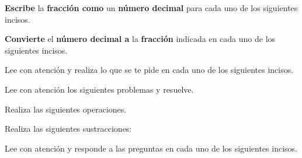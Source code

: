 \documentclass[11pt,addpoints]{exam}
\begin{document}

\begin{questions}
  \question[10] \textbf{Escribe} la \textbf{fracción como} un \textbf{n\'umero decimal} para cada uno de los siguientes incisos.
  \begin{multicols}{2}
    \begin{parts}
      
      
    \end{parts}
  \end{multicols}
  \newpage
  \question[10] \textbf{Convierte} el \textbf{n\'umero decimal a} la \textbf{fracción} indicada en cada uno de los siguientes incisos.

  \begin{multicols}{2}
    \begin{parts}
      
      
    \end{parts}
  \end{multicols}

  \question[10] Lee con atenci\'on y realiza lo que se te pide en cada uno de los siguientes incisos.
  \begin{multicols}{2}
    \begin{parts}
      
      
    \end{parts}
  \end{multicols}

  \question[10] Lee con atenci\'on los siguientes problemas y resuelve.

  \begin{parts}
    
    
  \end{parts}
  \newpage
  \question[10] Realiza las siguientes operaciones.
  \begin{multicols}{2}
    \begin{parts}
      
      
    \end{parts}
  \end{multicols}

  \question[10] Realiza las siguientes sustracciones:
  \begin{multicols}{2}
    \begin{parts}
      
      
    \end{parts}
  \end{multicols}
  \newpage
  \question[10] Lee con atenci\'on y responde a las preguntas en cada uno de los siguientes incisos.


\end{questions}
\end{document}
